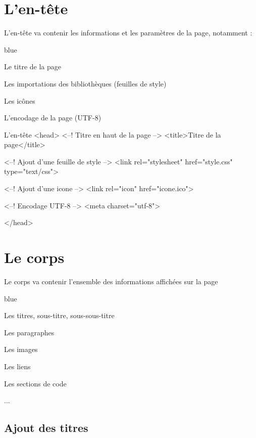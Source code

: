 \section{L'en-tête}

L'en-tête va contenir les informations et les paramètres de la page, notamment : 

\begin{items}{blue}{\Triangle}
    \item Le titre de la page
    \item Les importations des bibliothèques (feuilles de style)
    \item Les icônes
    \item L'encodage de la page (UTF-8)
    \end{items}


\begin{Html}{L'en-tête}
<head>
        <--! Titre en haut de la page -->
        <title>Titre de la page</title> 

        <--! Ajout d'une feuille de style -->
        <link rel="stylesheet" href="style.css" type="text/css"> 

        <--! Ajout d'une icone -->
        <link rel="icon" href="icone.ico">  
        
        <--! Encodage UTF-8 -->
        <meta charset="utf-8">  

</head>
    \end{Html}



\section{Le corps}

Le corps va contenir l'ensemble des informations affichées sur la page
    
\begin{items}{blue}{\Triangle}
    \item Les titres, sous-titre, sous-sous-titre
    \item Les paragraphes 
    \item Les images
    \item Les liens
    \item Les sections de code
    \item ...
\end{items}
    
    
\subsection{Ajout des titres}

